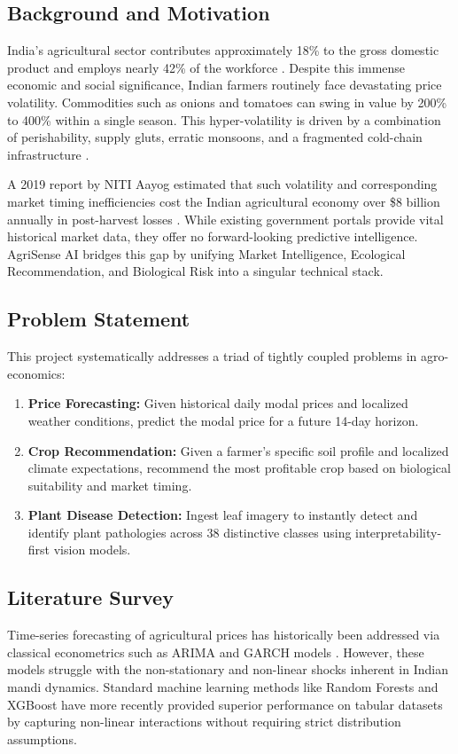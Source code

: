 \documentclass[conference]{IEEEtran}
\begin{document}
\subsection{Background and Motivation}
India's agricultural sector contributes approximately 18\% to the gross domestic product and employs nearly 42\% of the workforce \cite{fao2023}. Despite this immense economic and social significance, Indian farmers routinely face devastating price volatility. Commodities such as onions and tomatoes can swing in value by 200\% to 400\% within a single season. This hyper-volatility is driven by a combination of perishability, supply gluts, erratic monsoons, and a fragmented cold-chain infrastructure \cite{chand2012}. 

A 2019 report by NITI Aayog estimated that such volatility and corresponding market timing inefficiencies cost the Indian agricultural economy over \$8 billion annually in post-harvest losses \cite{nitiaayog2019}. While existing government portals provide vital historical market data, they offer no forward-looking predictive intelligence. AgriSense AI bridges this gap by unifying Market Intelligence, Ecological Recommendation, and Biological Risk into a singular technical stack.

\subsection{Problem Statement}
This project systematically addresses a triad of tightly coupled problems in agro-economics:
\begin{enumerate}
    \item \textbf{Price Forecasting:} Given historical daily modal prices and localized weather conditions, predict the modal price for a future 14-day horizon.
    \item \textbf{Crop Recommendation:} Given a farmer's specific soil profile and localized climate expectations, recommend the most profitable crop based on biological suitability and market timing.
    \item \textbf{Plant Disease Detection:} Ingest leaf imagery to instantly detect and identify plant pathologies across 38 distinctive classes using interpretability-first vision models.
\end{enumerate}

\subsection{Literature Survey}
Time-series forecasting of agricultural prices has historically been addressed via classical econometrics such as ARIMA and GARCH models \cite{box2015}. However, these models struggle with the non-stationary and non-linear shocks inherent in Indian mandi dynamics. Standard machine learning methods like Random Forests and XGBoost \cite{chen2016xgboost} have more recently provided superior performance on tabular datasets by capturing non-linear interactions without requiring strict distribution assumptions.
\end{document}
